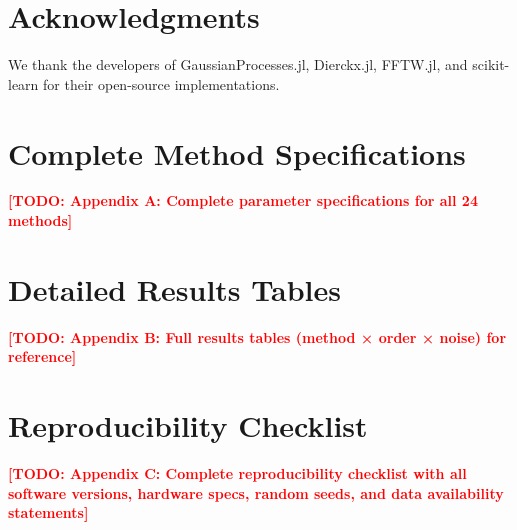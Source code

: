 \documentclass[11pt]{article}
\newcommand{\TODO}[1]{\textcolor{red}{\textbf{[TODO: #1]}}}
\begin{document}
% 
% 
% 
% 
% 
% 
% 
% 

\section*{Acknowledgments}
We thank the developers of GaussianProcesses.jl, Dierckx.jl, FFTW.jl, and scikit-learn for their open-source implementations.




\appendix

\section{Complete Method Specifications}
\label{app:methods}
\TODO{Appendix A: Complete parameter specifications for all 24 methods}

\section{Detailed Results Tables}
\label{app:results}
\TODO{Appendix B: Full results tables (method × order × noise) for reference}

\section{Reproducibility Checklist}
\label{app:reproducibility}
\TODO{Appendix C: Complete reproducibility checklist with all software versions, hardware specs, random seeds, and data availability statements}
\end{document}
